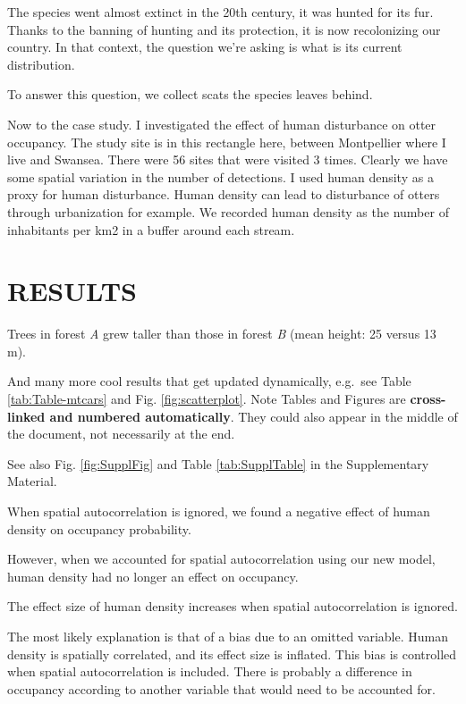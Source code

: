 \documentclass[
  11pt,
  a4paper,
]{article}
\begin{document}
The species went almost extinct in the 20th century, it was hunted for its fur. Thanks to the banning of hunting and its protection, it is now recolonizing our country. In that context, the question we're asking is what is its current distribution.

To answer this question, we collect scats the species leaves behind.

Now to the case study. I investigated the effect of human disturbance on otter occupancy.
The study site is in this rectangle here, between Montpellier where I live and Swansea.
There were 56 sites that were visited 3 times.
Clearly we have some spatial variation in the number of detections.
I used human density as a proxy for human disturbance.
Human density can lead to disturbance of otters through urbanization for example.
We recorded human density as the number of inhabitants per km2 in a buffer around each stream.

\section{RESULTS}\label{results}

Trees in forest \emph{A} grew taller than those in forest \emph{B} (mean height: 25 versus 13 m).

And many more cool results that get updated dynamically, e.g.~see Table \ref{tab:Table-mtcars} and Fig. \ref{fig:scatterplot}. Note Tables and Figures are \textbf{cross-linked and numbered automatically}. They could also appear in the middle of the document, not necessarily at the end.

See also Fig. \ref{fig:SupplFig} and Table \ref{tab:SupplTable} in the Supplementary Material.

When spatial autocorrelation is ignored, we found a negative effect of human density on occupancy probability.

However, when we accounted for spatial autocorrelation using our new model, human density had no longer an effect on occupancy.

The effect size of human density increases when spatial autocorrelation is ignored.

The most likely explanation is that of a bias due to an omitted variable.
Human density is spatially correlated, and its effect size is inflated.
This bias is controlled when spatial autocorrelation is included.
There is probably a difference in occupancy according to another variable that would need to be accounted for.
\end{document}
